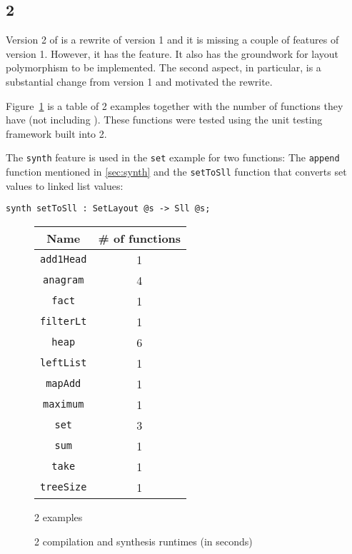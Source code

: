 \subsection{\Pika{} 2}

Version 2 of \Pika{} is a rewrite of version 1 and it is missing a couple of features of version 1. However, it has the \synth{} feature. It also has the groundwork for layout polymorphism to be implemented. The second aspect, in particular, is a substantial change from version 1 and motivated the rewrite.

Figure~\ref{fig:pika-2-examples} is a table of \Pika{} 2 examples together with the number of functions they have (not including \synth). These functions were tested using the unit testing framework built into \Pika{} 2.

The \lstinline[language=Pika]{synth} feature is used in the \verb|set| example for two functions: The \verb|append| function mentioned in \autoref{sec:synth} and the
\verb|setToSll| function that converts set values to linked list values:

\begin{lstlisting}[language=Pika]
synth setToSll : SetLayout @s -> Sll @s;
\end{lstlisting}

\begin{figure}
  \begin{tabular}{|c|c|}
    \hline
    Name & \# of functions\\
    \hline
    \verb|add1Head| & 1\\
    \verb|anagram| & 4\\
    \verb|fact| & 1\\
    \verb|filterLt| & 1\\
    \verb|heap| & 6\\
    \verb|leftList| & 1\\
    \verb|mapAdd| & 1\\
    \verb|maximum| & 1\\
    \verb|set| & 3\\
    \verb|sum| & 1\\
    \verb|take| & 1\\
    \verb|treeSize| & 1\\
    \hline
  \end{tabular}
  \caption{\Pika{} 2 examples}
  \label{fig:pika-2-examples}
\end{figure}                   

\begin{figure}
  
  \caption{\Pika{} 2 compilation and synthesis runtimes (in seconds)}
\end{figure}

